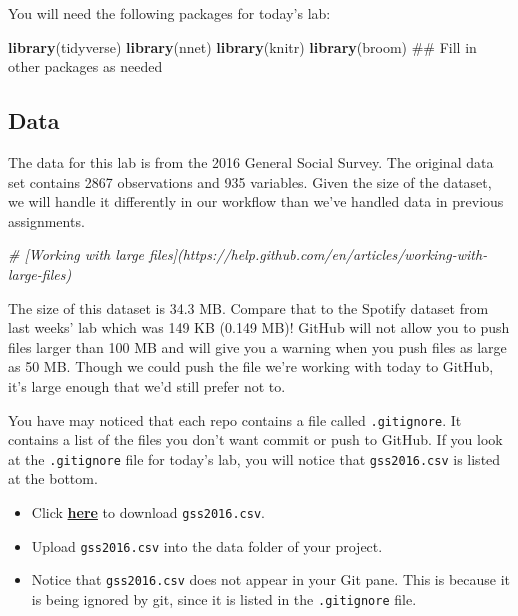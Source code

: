\documentclass[]{book}
\newenvironment{Shaded}{\begin{snugshade}}{\end{snugshade}}
\newcommand{\KeywordTok}[1]{\textcolor[rgb]{0.13,0.29,0.53}{\textbf{#1}}}
\newcommand{\CommentTok}[1]{\textcolor[rgb]{0.56,0.35,0.01}{\textit{#1}}}
\newcommand{\NormalTok}[1]{#1}
\providecommand{\tightlist}{%
  \setlength{\itemsep}{0pt}\setlength{\parskip}{0pt}}
\begin{document}
You will need the following packages for today's lab:

\begin{Shaded}
\begin{Highlighting}[]
\KeywordTok{library}\NormalTok{(tidyverse)}
\KeywordTok{library}\NormalTok{(nnet)}
\KeywordTok{library}\NormalTok{(knitr)}
\KeywordTok{library}\NormalTok{(broom)}
\NormalTok{## Fill in other packages as needed}
\end{Highlighting}
\end{Shaded}

\subsection{Data}\label{data-7}

The data for this lab is from the 2016 General Social Survey. The
original data set contains 2867 observations and 935 variables. Given
the size of the dataset, we will handle it differently in our workflow
than we've handled data in previous assignments.

\begin{Shaded}
\begin{Highlighting}[]
\CommentTok{# [Working with large files](https://help.github.com/en/articles/working-with-large-files)}
\end{Highlighting}
\end{Shaded}

The size of this dataset is 34.3 MB. Compare that to the Spotify dataset
from last weeks' lab which was 149 KB (0.149 MB)! GitHub will not allow
you to push files larger than 100 MB and will give you a warning when
you push files as large as 50 MB. Though we could push the file we're
working with today to GitHub, it's large enough that we'd still prefer
not to.

You have may noticed that each repo contains a file called
\texttt{.gitignore}. It contains a list of the files you don't want
commit or push to GitHub. If you look at the \texttt{.gitignore} file
for today's lab, you will notice that \texttt{gss2016.csv} is listed at
the bottom.

\begin{itemize}
\tightlist
\item
  Click
  \href{https://www2.stat.duke.edu/courses/Spring19/sta210.001/labs/data/gss2016.csv}{\textbf{here}}
  to download \texttt{gss2016.csv}.
\item
  Upload \texttt{gss2016.csv} into the data folder of your project.
\item
  Notice that \texttt{gss2016.csv} does not appear in your Git pane.
  This is because it is being ignored by git, since it is listed in the
  \texttt{.gitignore} file.
\end{itemize}
\end{document}

